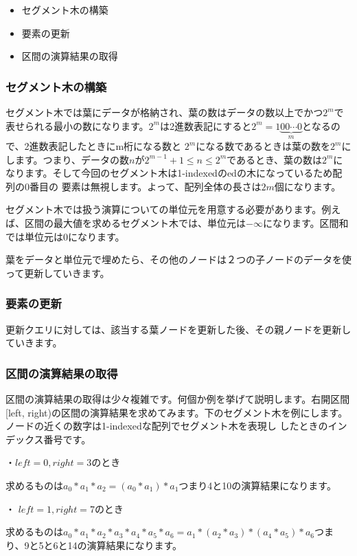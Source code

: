 \documentclass{jlreq}
\begin{document}
\begin{itemize}
	\item セグメント木の構築
	\item 要素の更新
	\item 区間の演算結果の取得
\end{itemize}

\subsubsection{セグメント木の構築}
セグメント木では葉にデータが格納され、葉の数はデータの数以上でかつ$2^m$で表せられる最小の数になります。$2^m$は2進数表記にすると$2^m = 1\underbrace{00\cdots0}_{m}$となるので、2進数表記したときにm桁になる数と
$2^m$になる数であるときは葉の数を$2^m$にします。つまり、データの数$n$が$2^{m-1} + 1 \leq n \leq 2^m$であるとき、葉の数は$2^m$になります。そして今回のセグメント木は1-indexedのedの木になっているため配列の0番目の
要素は無視します。よって、配列全体の長さは$2 m$個になります。

セグメント木では扱う演算についての単位元を用意する必要があります。例えば、区間の最大値を求めるセグメント木では、単位元は$-\infty$になります。区間和では単位元は0になります。

葉をデータと単位元で埋めたら、その他のノードは２つの子ノードのデータを使って更新していきます。

\subsubsection{要素の更新}
更新クエリに対しては、該当する葉ノードを更新した後、その親ノードを更新していきます。

\subsubsection{区間の演算結果の取得}
区間の演算結果の取得は少々複雑です。何個か例を挙げて説明します。右開区間[left, right)の区間の演算結果を求めてみます。下のセグメント木を例にします。ノードの近くの数字は1-indexedな配列でセグメント木を表現し
したときのインデックス番号です。

・$left = 0, right = 3$のとき

求めるものは$a_0 * a_1 * a_2 = (a_0 * a_1) * a_1$つまり4と10の演算結果になります。 

・ $left = 1, right = 7$のとき

求めるものは$a_0 * a_1 * a_2 * a_3 * a_4 * a_5 * a_6 = a_1 * (a_2 * a_3) * (a_4 * a_5) * a_6$つまり、9と5と6と14の演算結果になります。
\end{document}
